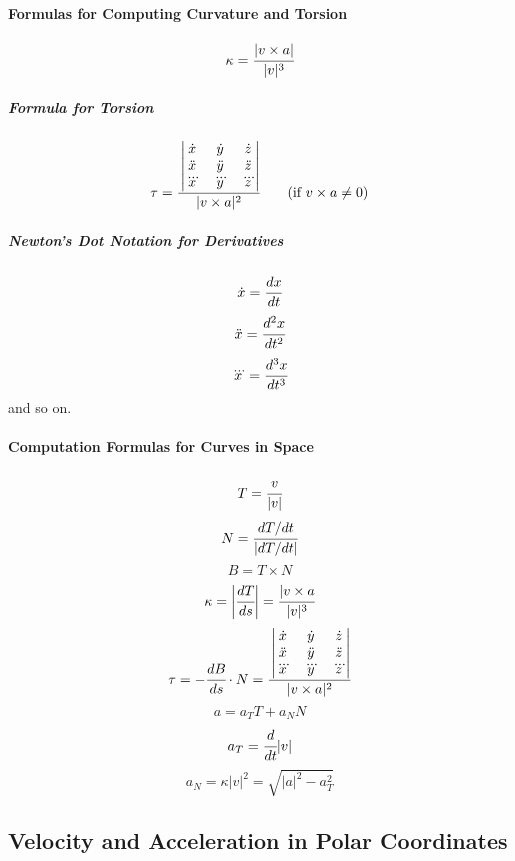 \documentclass{article}
\begin{document}
                \paragraph{Formulas for Computing Curvature and Torsion}
                    \[\kappa=\cfrac{|v\times a|}{|v|^3}\]
                    \subparagraph{Formula for Torsion}
                        \[\tau=\cfrac{
                            \begin{vmatrix}
                                \dot{x}&\dot{y}&\dot{z}\\
                                \ddot{x}&\ddot{y}&\ddot{z}\\
                                \dddot{x}&\dddot{y}&\dddot{z}\\
                            \end{vmatrix}
                        }{|v\times a|^2}\qquad(\text{if } v\times a\ne 0)\]
                    \subparagraph{Newton's Dot Notation for Derivatives}
                    \[\dot{x}=\cfrac{dx}{dt}\]
                    \[\ddot{x}=\cfrac{d^2x}{dt^2}\]
                    \[\dddot{x}=\cfrac{d^3x}{dt^3}\]
                    and so on.
                \paragraph{Computation Formulas for Curves in Space}
                    \[T=\cfrac{v}{|v|}\]
                    \[N=\cfrac{dT/dt}{|dT/dt|}\]
                    \[B=T\times N\]
                    \[\kappa=\bigg|\cfrac{dT}{ds}\bigg|=\cfrac{|v\times a}{|v|^3}\]
                    \[\tau=-\cfrac{dB}{ds}\cdot N=\cfrac{
                            \begin{vmatrix}
                                \dot{x}&\dot{y}&\dot{z}\\
                                \ddot{x}&\ddot{y}&\ddot{z}\\
                                \dddot{x}&\dddot{y}&\dddot{z}\\
                            \end{vmatrix}
                        }{|v\times a|^2}\]
                    \[a=a_TT+a_NN\]
                    \[a_T=\cfrac{d}{dt}|v|\]
                    \[a_N=\kappa|v|^2=\sqrt{|a|^2-a_T^2}\]
        \subsection{Velocity and Acceleration in Polar Coordinates}
\end{document}

